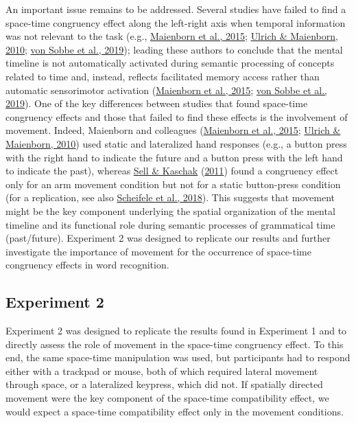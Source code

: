\documentclass[
  a4paper,12pt,twoside,onecolumn,openright,final,oldfontcommands]{memoir}
\begin{document}
An important issue remains to be addressed. Several studies have failed to find a space-time congruency effect along the left-right axis when temporal information was not relevant to the task (e.g., \protect\hyperlink{ref-maienborn_we_2015}{Maienborn et al., 2015}; \protect\hyperlink{ref-ulrich_leftright_2010}{Ulrich \& Maienborn, 2010}; \protect\hyperlink{ref-von_sobbe_space-time_2019}{von Sobbe et al., 2019}); leading these authors to conclude that the mental timeline is not automatically activated during semantic processing of concepts related to time and, instead, reflects facilitated memory access rather than automatic sensorimotor activation (\protect\hyperlink{ref-maienborn_we_2015}{Maienborn et al., 2015}; \protect\hyperlink{ref-von_sobbe_space-time_2019}{von Sobbe et al., 2019}). One of the key differences between studies that found space-time congruency effects and those that failed to find these effects is the involvement of movement. Indeed, Maienborn and colleagues (\protect\hyperlink{ref-maienborn_we_2015}{Maienborn et al., 2015}; \protect\hyperlink{ref-ulrich_leftright_2010}{Ulrich \& Maienborn, 2010}) used static and lateralized hand responses (e.g., a button press with the right hand to indicate the future and a button press with the left hand to indicate the past), whereas \protect\hyperlink{ref-sell_processing_2011}{Sell \& Kaschak} (\protect\hyperlink{ref-sell_processing_2011}{2011}) found a congruency effect only for an arm movement condition but not for a static button-press condition (for a replication, see also \protect\hyperlink{ref-scheifele_replication_2018}{Scheifele et al., 2018}). This suggests that movement might be the key component underlying the spatial organization of the mental timeline and its functional role during semantic processes of grammatical time (past/future). Experiment 2 was designed to replicate our results and further investigate the importance of movement for the occurrence of space-time congruency effects in word recognition.

\hypertarget{experiment-2}{%
\subsection{Experiment 2}\label{experiment-2}}

Experiment 2 was designed to replicate the results found in Experiment 1 and to directly assess the role of movement in the space-time congruency effect. To this end, the same space-time manipulation was used, but participants had to respond either with a trackpad or mouse, both of which required lateral movement through space, or a lateralized keypress, which did not. If spatially directed movement were the key component of the space-time compatibility effect, we would expect a space-time compatibility effect only in the movement conditions.
\end{document}
